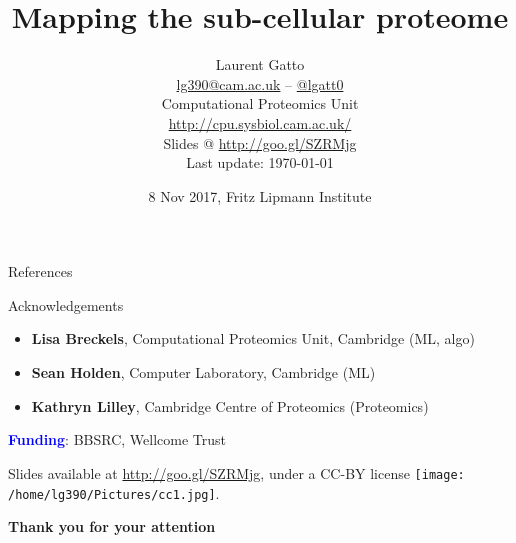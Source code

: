 \documentclass[presentation]{beamer}
\date{8 Nov 2017, Fritz Lipmann Institute}
\title{
  \textbf{Mapping the sub-cellular proteome}
}
\author{Laurent Gatto\\
  \url{lg390@cam.ac.uk} -- \url{@lgatt0}\\
  Computational Proteomics Unit\\
  \url{http://cpu.sysbiol.cam.ac.uk/}\\
  \bigskip
  Slides @ \url{http://goo.gl/SZRMjg}\\
  \tiny{Last update: \today}
}
\begin{document}
\maketitle









\begin{frame}[allowframebreaks]{References}
  \footnotesize
  
  
\end{frame}


\begin{frame}
  \begin{block}{Acknowledgements}
    \begin{itemize}
    \item \textbf{Lisa Breckels}, Computational Proteomics Unit, Cambridge (ML, algo)
    \item \textbf{Sean Holden}, Computer Laboratory, Cambridge (ML)
    \item \textbf{Kathryn Lilley}, Cambridge Centre of Proteomics (Proteomics)
    \end{itemize}
  \end{block}

  \textcolor{Blue}{\textbf{Funding}}: BBSRC, Wellcome Trust

  \bigskip

  {\footnotesize Slides available at
    \href{http://dx.doi.org/10.6084/m9.figshare.1572983}{http://goo.gl/SZRMjg},
    under a CC-BY
    license \texttt{[image: /home/lg390/Pictures/cc1.jpg]}.}

  \begin{center}
    \textbf{Thank you for your attention}
  \end{center}

\end{frame}
\end{document}
